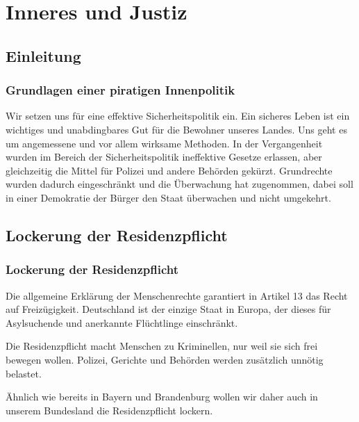 \section{Inneres und Justiz}

\subsection*{Einleitung}
\subsubsection{Grundlagen einer piratigen Innenpolitik}
\abstimmung
Wir setzen uns für eine effektive Sicherheitspolitik ein. Ein sicheres Leben ist ein wichtiges und unabdingbares Gut für die Bewohner unseres Landes. Uns geht es um angemessene und vor allem wirksame Methoden. In der Vergangenheit wurden im Bereich der Sicherheitspolitik ineffektive Gesetze erlassen, aber gleichzeitig die Mittel für Polizei und andere Behörden gekürzt. Grundrechte wurden dadurch eingeschränkt und die Überwachung hat zugenommen, dabei soll in einer Demokratie der Bürger den Staat überwachen und nicht umgekehrt.
 
\subsection*{Lockerung der Residenzpflicht}
\subsubsection{Lockerung der Residenzpflicht}
\abstimmung
Die allgemeine Erklärung der Menschenrechte garantiert in Artikel 13 das Recht auf Freizügigkeit. Deutschland ist der einzige Staat in Europa, der dieses für Asylsuchende und anerkannte Flüchtlinge einschränkt.

Die Residenzpflicht macht Menschen zu Kriminellen, nur weil sie sich frei bewegen wollen. Polizei, Gerichte und Behörden werden zusätzlich unnötig belastet.

Ähnlich wie bereits in Bayern und Brandenburg wollen wir daher auch in unserem Bundesland die Residenzpflicht lockern.
 


